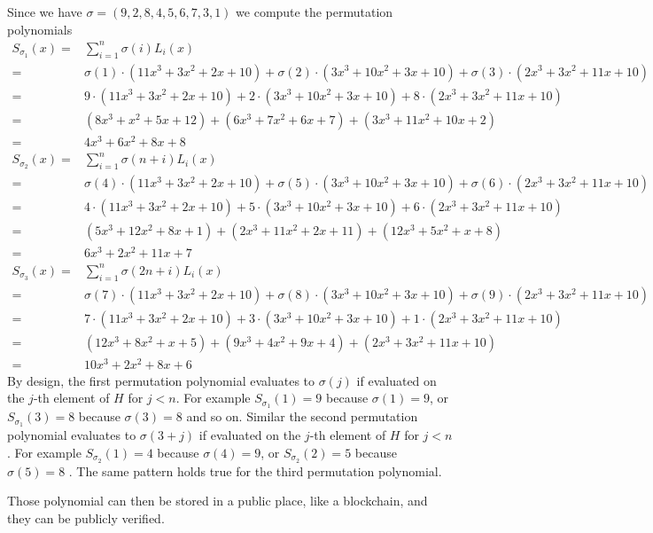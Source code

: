 \begin{example}
Since we have $\sigma = (9,2,8,4,5,6,7,3,1)$ we compute the permutation polynomials
$$
\begin{array}{rl}
S_{\sigma_1}(x) = & \sum_{i=1}^{n} \sigma(i)L_i(x) \\       
         = & \sigma(1)\cdot(11x^3 +3x^2 +2x + 10) + \sigma(2)\cdot (3x^3 +10x^2+ 3x + 10) + \sigma(3)\cdot (2x^3 + 3x^2 +11x +10) \\            
         = & 9\cdot(11x^3 +3x^2 +2x + 10) + 2\cdot (3x^3 +10x^2+ 3x + 10) + 8\cdot (2x^3 + 3x^2 +11x +10) \\           
         = & (8x^3 + x^2 + 5x + 12) + (6x^3 + 7x^2 + 6x + 7) + (3x^3 + 11x^2 + 10x + 2) \\    
         = & 4x^3 + 6x^2 + 8x + 8             
\end{array}
$$
$$
\begin{array}{rl}
S_{\sigma_2}(x) = & \sum_{i=1}^{n} \sigma(n+i)L_i(x) \\       
         = & \sigma(4)\cdot(11x^3 +3x^2 +2x + 10) + \sigma(5)\cdot (3x^3 +10x^2+ 3x + 10) + \sigma(6)\cdot (2x^3 + 3x^2 +11x +10) \\ 
         = & 4\cdot(11x^3 +3x^2 +2x + 10) + 5\cdot (3x^3 +10x^2+ 3x + 10) + 6\cdot (2x^3 + 3x^2 +11x +10) \\ 
         = &  (5x^3 + 12x^2 + 8x + 1) + (2x^3 + 11x^2 + 2x + 11) + (12x^3 + 5x^2 + x + 8) \\
         = & 6x^3 + 2x^2 + 11x + 7
\end{array}
$$
$$
\begin{array}{rl}
S_{\sigma_3}(x) = & \sum_{i=1}^{n} \sigma(2n+i)L_i(x) \\       
         = & \sigma(7)\cdot(11x^3 +3x^2 +2x + 10) + \sigma(8)\cdot (3x^3 +10x^2+ 3x + 10) + \sigma(9)\cdot (2x^3 + 3x^2 +11x +10) \\ 
         = & 7\cdot(11x^3 +3x^2 +2x + 10) + 3\cdot (3x^3 +10x^2+ 3x + 10) + 1\cdot (2x^3 + 3x^2 +11x +10) \\  
         = & (12x^3 + 8x^2 + x + 5) + (9x^3 + 4x^2 + 9x + 4) + (2x^3 + 3x^2 + 11x + 10)\\
         = & 10x^3 + 2x^2 + 8x + 6
\end{array}
$$
By design, the first permutation polynomial evaluates to $\sigma(j)$ if evaluated on the $j$-th element of $H$ for $j<n$. For example $S_{\sigma_1}(1)=9$ because $\sigma(1)=9$, or $S_{\sigma_1}(3)=8$ because $\sigma(3)=8$ and so on. Similar the second permutation polynomial evaluates to $\sigma(3+j)$ if evaluated on the $j$-th element of $H$ for $j<n$. For example $S_{\sigma_2}(1)=4$ because $\sigma(4)=9$, or $S_{\sigma_2}(2)=5$ because $\sigma(5)=8$ . The same pattern holds true for the third permutation polynomial.


Those polynomial can then be stored in a public place, like a blockchain, and they can be publicly verified.
\end{example}











